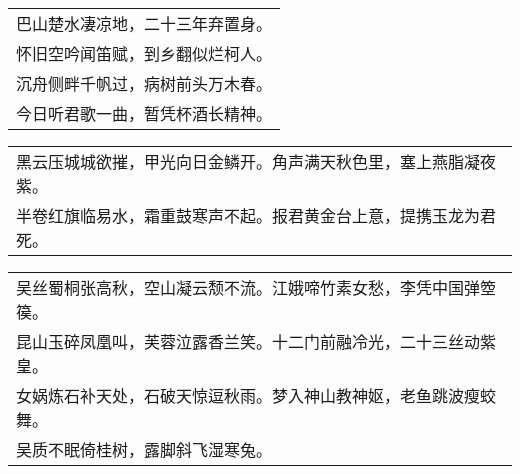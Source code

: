 \nopagebreak%
\nopagebreak%
\noindent\begin{minipage}{\linewidth}
  \vskip-3pt\begin{table}[H]
    \centering
    \begin{tabular}{@{}l@{}}
巴山楚水凄凉地，二十三年弃置身。\\
怀旧空吟闻笛赋，到乡翻似烂柯人。\\
沉舟侧畔千帆过，病树前头万木春。\\
今日听君歌一曲，暂凭杯酒长精神。
    \end{tabular}
  \end{table}
\end{minipage}
\vspace{1cm}


\nopagebreak%
\nopagebreak%
\noindent\begin{minipage}{\linewidth}
  \vskip-3pt\begin{table}[H]
    \centering
    \begin{tabular}{@{}l@{}}
黑云压城城欲摧，甲光向日金鳞开。角声满天秋色里，塞上燕脂凝夜紫。\\
半卷红旗临易水，霜重鼓寒声不起。报君黄金台上意，提携玉龙为君死。
    \end{tabular}
  \end{table}
\end{minipage}
\vspace{1cm}


\nopagebreak%
\nopagebreak%
\noindent\begin{minipage}{\linewidth}
  \vskip-3pt\begin{table}[H]
    \centering
    \begin{tabular}{@{}l@{}}
吴丝蜀桐张高秋，空山凝云颓不流。江娥啼竹素女愁，李凭中国弹箜篌。\\
昆山玉碎凤凰叫，芙蓉泣露香兰笑。十二门前融冷光，二十三丝动紫皇。\\
女娲炼石补天处，石破天惊逗秋雨。梦入神山教神妪，老鱼跳波瘦蛟舞。\\
吴质不眠倚桂树，露脚斜飞湿寒兔。
    \end{tabular}
  \end{table}
\end{minipage}
\vspace{1cm}


